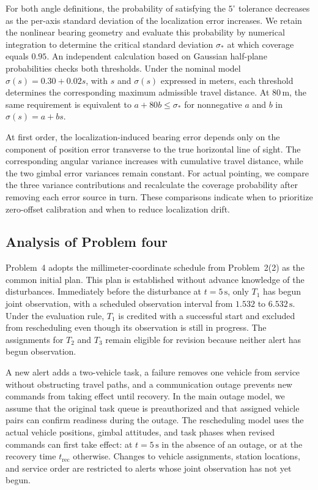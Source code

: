 \documentclass{swmcmthesis}
\begin{document}
For both angle definitions, the probability of satisfying the \(5^\circ\) tolerance decreases as the per-axis standard deviation of the localization error increases. We retain the nonlinear bearing geometry and evaluate this probability by numerical integration to determine the critical standard deviation \(\sigma_*\) at which coverage equals \(0.95\). An independent calculation based on Gaussian half-plane probabilities checks both thresholds. Under the nominal model \(\sigma(s)=0.30+0.02s\), with \(s\) and \(\sigma(s)\) expressed in meters, each threshold determines the corresponding maximum admissible travel distance. At \(80\,\mathrm{m}\), the same requirement is equivalent to \(a+80b\leq\sigma_*\) for nonnegative \(a\) and \(b\) in \(\sigma(s)=a+bs\).

At first order, the localization-induced bearing error depends only on the component of position error transverse to the true horizontal line of sight. The corresponding angular variance increases with cumulative travel distance, while the two gimbal error variances remain constant. For actual pointing, we compare the three variance contributions and recalculate the coverage probability after removing each error source in turn. These comparisons indicate when to prioritize zero-offset calibration and when to reduce localization drift.

\subsection{Analysis of Problem four}

Problem~4 adopts the millimeter-coordinate schedule from Problem~2(2) as the common initial plan. This plan is established without advance knowledge of the disturbances. Immediately before the disturbance at \(t=5\,\mathrm{s}\), only \(T_1\) has begun joint observation, with a scheduled observation interval from \(1.532\) to \(6.532\,\mathrm{s}\). Under the evaluation rule, \(T_1\) is credited with a successful start and excluded from rescheduling even though its observation is still in progress. The assignments for \(T_2\) and \(T_3\) remain eligible for revision because neither alert has begun observation.

A new alert adds a two-vehicle task, a failure removes one vehicle from service without obstructing travel paths, and a communication outage prevents new commands from taking effect until recovery. In the main outage model, we assume that the original task queue is preauthorized and that assigned vehicle pairs can confirm readiness during the outage. The rescheduling model uses the actual vehicle positions, gimbal attitudes, and task phases when revised commands can first take effect: at \(t=5\,\mathrm{s}\) in the absence of an outage, or at the recovery time \(t_{\mathrm{rec}}\) otherwise. Changes to vehicle assignments, station locations, and service order are restricted to alerts whose joint observation has not yet begun.
\end{document}
